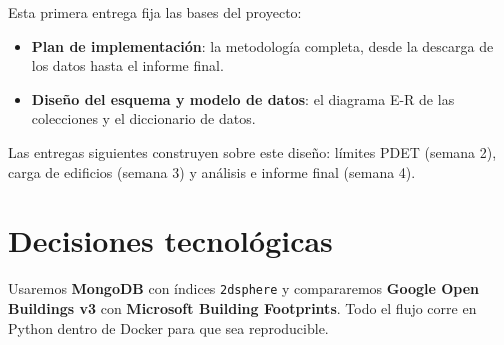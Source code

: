 \documentclass[11pt,a4paper]{article}
\newcommand{\campo}[1]{\texttt{#1}}
\begin{document}
Esta primera entrega fija las bases del proyecto:

\begin{itemize}
  \item \textbf{Plan de implementación}: la metodología completa, desde la
        descarga de los datos hasta el informe final.
  \item \textbf{Diseño del esquema y modelo de datos}: el diagrama E-R de las
        colecciones y el diccionario de datos.
\end{itemize}

Las entregas siguientes construyen sobre este diseño: límites PDET (semana 2),
carga de edificios (semana 3) y análisis e informe final (semana 4).

\section{Decisiones tecnológicas}
\label{sec:decisiones}

Usaremos \textbf{MongoDB} con índices \campo{2dsphere} y compararemos
\textbf{Google Open Buildings v3} con \textbf{Microsoft Building Footprints}.
Todo el flujo corre en Python dentro de Docker para que sea reproducible.
\end{document}
